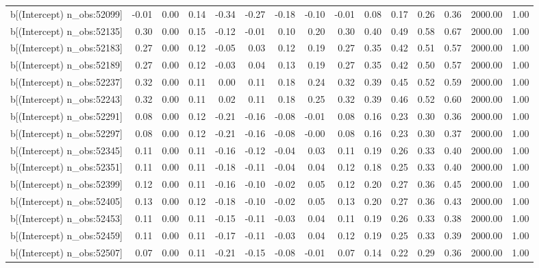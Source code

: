 \begin{table}[ht]
\begin{tabular}{rrrrrrrrrrrrrrr}
  b[(Intercept) n\_obs:52099] & -0.01 & 0.00 & 0.14 & -0.34 & -0.27 & -0.18 & -0.10 & -0.01 & 0.08 & 0.17 & 0.26 & 0.36 & 2000.00 & 1.00 \\ 
  b[(Intercept) n\_obs:52135] & 0.30 & 0.00 & 0.15 & -0.12 & -0.01 & 0.10 & 0.20 & 0.30 & 0.40 & 0.49 & 0.58 & 0.67 & 2000.00 & 1.00 \\ 
  b[(Intercept) n\_obs:52183] & 0.27 & 0.00 & 0.12 & -0.05 & 0.03 & 0.12 & 0.19 & 0.27 & 0.35 & 0.42 & 0.51 & 0.57 & 2000.00 & 1.00 \\ 
  b[(Intercept) n\_obs:52189] & 0.27 & 0.00 & 0.12 & -0.03 & 0.04 & 0.13 & 0.19 & 0.27 & 0.35 & 0.42 & 0.50 & 0.57 & 2000.00 & 1.00 \\ 
  b[(Intercept) n\_obs:52237] & 0.32 & 0.00 & 0.11 & 0.00 & 0.11 & 0.18 & 0.24 & 0.32 & 0.39 & 0.45 & 0.52 & 0.59 & 2000.00 & 1.00 \\ 
  b[(Intercept) n\_obs:52243] & 0.32 & 0.00 & 0.11 & 0.02 & 0.11 & 0.18 & 0.25 & 0.32 & 0.39 & 0.46 & 0.52 & 0.60 & 2000.00 & 1.00 \\ 
  b[(Intercept) n\_obs:52291] & 0.08 & 0.00 & 0.12 & -0.21 & -0.16 & -0.08 & -0.01 & 0.08 & 0.16 & 0.23 & 0.30 & 0.36 & 2000.00 & 1.00 \\ 
  b[(Intercept) n\_obs:52297] & 0.08 & 0.00 & 0.12 & -0.21 & -0.16 & -0.08 & -0.00 & 0.08 & 0.16 & 0.23 & 0.30 & 0.37 & 2000.00 & 1.00 \\ 
  b[(Intercept) n\_obs:52345] & 0.11 & 0.00 & 0.11 & -0.16 & -0.12 & -0.04 & 0.03 & 0.11 & 0.19 & 0.26 & 0.33 & 0.40 & 2000.00 & 1.00 \\ 
  b[(Intercept) n\_obs:52351] & 0.11 & 0.00 & 0.11 & -0.18 & -0.11 & -0.04 & 0.04 & 0.12 & 0.18 & 0.25 & 0.33 & 0.40 & 2000.00 & 1.00 \\ 
  b[(Intercept) n\_obs:52399] & 0.12 & 0.00 & 0.11 & -0.16 & -0.10 & -0.02 & 0.05 & 0.12 & 0.20 & 0.27 & 0.36 & 0.45 & 2000.00 & 1.00 \\ 
  b[(Intercept) n\_obs:52405] & 0.13 & 0.00 & 0.12 & -0.18 & -0.10 & -0.02 & 0.05 & 0.13 & 0.20 & 0.27 & 0.36 & 0.43 & 2000.00 & 1.00 \\ 
  b[(Intercept) n\_obs:52453] & 0.11 & 0.00 & 0.11 & -0.15 & -0.11 & -0.03 & 0.04 & 0.11 & 0.19 & 0.26 & 0.33 & 0.38 & 2000.00 & 1.00 \\ 
  b[(Intercept) n\_obs:52459] & 0.11 & 0.00 & 0.11 & -0.17 & -0.11 & -0.03 & 0.04 & 0.12 & 0.19 & 0.25 & 0.33 & 0.39 & 2000.00 & 1.00 \\ 
  b[(Intercept) n\_obs:52507] & 0.07 & 0.00 & 0.11 & -0.21 & -0.15 & -0.08 & -0.01 & 0.07 & 0.14 & 0.22 & 0.29 & 0.36 & 2000.00 & 1.00 \\ 

\end{tabular}
\end{table}
